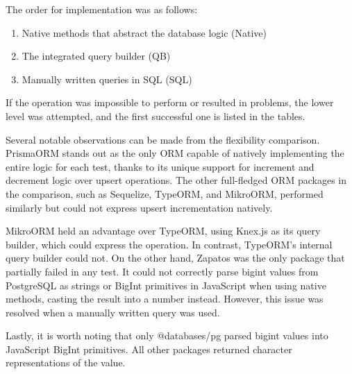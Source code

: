 The order for implementation was as follows:
\begin{enumerate}
  \item Native methods that abstract the database logic (Native)
  \item The integrated query builder (QB)
  \item Manually written queries in SQL (SQL)
\end{enumerate}
If the operation was impossible to perform or resulted in problems, the lower
level was attempted, and the first successful one is listed in the tables.

Several notable observations can be made from the flexibility comparison.
PrismaORM stands out as the only ORM capable of natively implementing the entire
logic for each test, thanks to its unique support for increment and decrement
logic over upsert operations. The other full-fledged ORM packages in the
comparison, such as Sequelize, TypeORM, and MikroORM, performed similarly but
could not express upsert incrementation natively.

MikroORM held an advantage over TypeORM, using Knex.js as its query builder,
which could express the operation. In contrast, TypeORM's internal query builder
could not. On the other hand, Zapatos was the only package that partially failed
in any test. It could not correctly parse bigint values from PostgreSQL as
strings or BigInt primitives in JavaScript when using native methods, casting
the result into a number instead. However, this issue was resolved when a
manually written query was used.

Lastly, it is worth noting that only @databases/pg parsed bigint values into
JavaScript BigInt primitives. All other packages returned character
representations of the value. 



